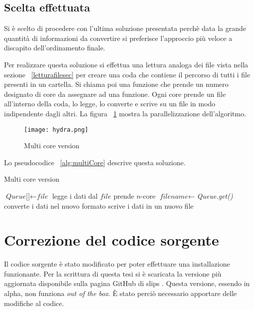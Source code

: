 \documentclass[../main.tex]{subfiles}
\begin{document}
\subsection{Scelta effettuata}

Si è scelto di procedere con l'ultima soluzione presentata perchè data la grande quantità di informazioni da convertire si preferisce l'approccio più veloce a discapito dell'ordinamento finale.

Per realizzare questa soluzione si effettua una lettura analoga dei file vista nella sezione ~\ref{letturafilesec} per creare una coda che contiene il percorso di tutti i file presenti in un cartella. Si chiama poi una funzione che prende un numero designato di core da assegnare ad una funzione. Ogni core prende un file all'interno della coda, lo legge, lo converte e scrive su un file in modo indipendente dagli altri.
La figura ~\ref{fig:multiCore} mostra la parallelizzazione dell'algoritmo.

\begin{figure}[H]
				\centering
\texttt{[image: hydra.png]}
				\caption{Multi core version}
				\label{fig:multiCore}
\end{figure}

Lo pseudocodice ~\ref{alg:multiCore} descrive questa soluzione.
\begin{algorithm}[H]
\caption{Multi core version}
				\label{alg:multiCore}
\begin{algorithmic}[1]
\State $\textit{Queue[]} \gets \textit{file}$
\State legge i dati dal $\textit{file}$
\State prende $n$-core
\State $\textit{filename} \gets $\textit{Queue.get()}
\State converte i dati nel nuovo formato
\State scrive i dati in un nuovo file
\EndWhile
\EndFor
\EndProcedure
\end{algorithmic}
\end{algorithm}

\section{Correzione del codice sorgente}

Il codice sorgente è stato modificato per poter effettuare una installazione funzionante.
Per la scrittura di questa tesi si è scaricata la versione più aggiornata disponibile sulla pagina GitHub di slips \cite{slipscurrent}. Questa versione, essendo in alpha, non funziona \textit{out of the box}. È stato perciò necessario apportare delle modifiche al codice.
\end{document}
